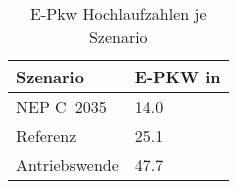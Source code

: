 {
\renewcommand{\arraystretch}{1.2}%
\begin{table}[H]
	\begin{center}
		\caption{E-Pkw Hochlaufzahlen je Szenario}
		\begin{tabu} to 0.6\textwidth {X[1] X[2, r]}
			\toprule
			Szenario         & E-PKW in \si{\MioStk}	\\ \midrule
			NEP C~\num{2035} & \num{14.0}               \\
			Referenz         & \num{25.1}               \\
			Antriebswende    & \num{47.7}               \\ \bottomrule
		\end{tabu}
		\label{tab:SzenarienRampUp}
	\end{center}
	\vspace{-3mm}%
\end{table}
}
